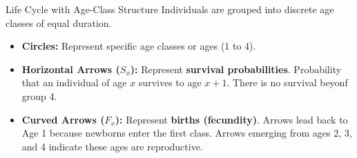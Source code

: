 \begin{frame}{Life Cycle with Age-Class Structure}
    \small
    Individuals are grouped into discrete age classes of equal duration.
    
    \vspace{1em}
    
    \begin{center}
    \end{center}

    \vspace{0.5em}

    \footnotesize
    \begin{itemize}
        \item \textbf{Circles:} Represent specific age classes or ages (1 to 4).
        \item \textbf{Horizontal Arrows ($S_x$):} Represent \textbf{survival probabilities}. Probability that an individual of age $x$ survives to age $x+1$. There is no survival beyonf group 4.
        \item \textbf{Curved Arrows ($F_x$):} Represent \textbf{births (fecundity)}. Arrows lead back to Age 1 because newborns enter the first class. Arrows emerging from ages 2, 3, and 4 indicate these ages are reproductive.
    \end{itemize}
\end{frame}


